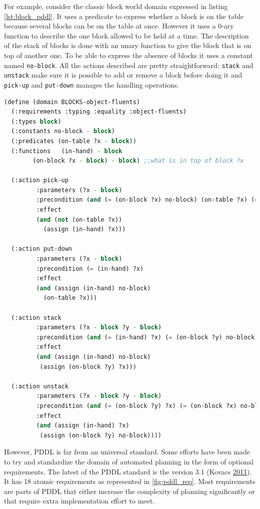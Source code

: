 \documentclass[11pt,a4paper,twoside,openright,titlepage,numbers=noenddot,headinclude,cleardoublepage=empty,openany]{scrreprt}
\theoremstyle{plain}
\theoremstyle{definition}
\theoremstyle{remark}
\newcommand{\passthrough}[1]{#1}
\begin{document}
For example, consider the classic block world domain expressed in
listing \ref{lst:block_pddl}. It uses a predicate to express whether a
block is on the table because several blocks can be on the table at
once. However it uses a 0-ary function to describe the one block allowed
to be held at a time. The description of the stack of blocks is done
with an unary function to give the block that is on top of another one.
To be able to express the absence of blocks it uses a constant named
\passthrough{\lstinline!no-block!}. All the actions described are pretty
straightforward: \passthrough{\lstinline!stack!} and
\passthrough{\lstinline!unstack!} make sure it is possible to add or
remove a block before doing it and \passthrough{\lstinline!pick-up!} and
\passthrough{\lstinline!put-down!} manages the handling operations.

\begin{lstlisting}[language=Lisp, caption={Classical PDDL 3.0 definition of the domain Block world}, escapechar={$}, label=lst:block_pddl]
(define (domain BLOCKS-object-fluents)
  (:requirements :typing :equality :object-fluents)
  (:types block)
  (:constants no-block - block)
  (:predicates (on-table ?x - block))
  (:functions   (in-hand) - block
        (on-block ?x - block) - block) ;;what is in top of block ?x

  (:action pick-up
         :parameters (?x - block)
         :precondition (and (= (on-block ?x) no-block) (on-table ?x) (= (in-hand) no-block))
         :effect
         (and (not (on-table ?x))
           (assign (in-hand) ?x)))

  (:action put-down
         :parameters (?x - block)
         :precondition (= (in-hand) ?x)
         :effect
         (and (assign (in-hand) no-block)
           (on-table ?x)))

  (:action stack
         :parameters (?x - block ?y - block)
         :precondition (and (= (in-hand) ?x) (= (on-block ?y) no-block))
         :effect
         (and (assign (in-hand) no-block)
          (assign (on-block ?y) ?x)))

  (:action unstack
         :parameters (?x - block ?y - block)
         :precondition (and (= (on-block ?y) ?x) (= (on-block ?x) no-block) (= (in-hand) no-block))
         :effect
         (and (assign (in-hand) ?x)
          (assign (on-block ?y) no-block))))
\end{lstlisting}

However, PDDL is far from an universal standard. Some efforts have been
made to try and standardize the domain of automated planning in the form
of optional requirements. The latest of the PDDL standard is the version
3.1 (Kovacs \protect\hyperlink{ref-kovacs_bnf_2011}{2011}). It has 18
atomic requirements as represented in \cref{fig:pddl_req}. Most
requirements are parts of PDDL that either increase the complexity of
planning significantly or that require extra implementation effort to
meet.
\end{document}
